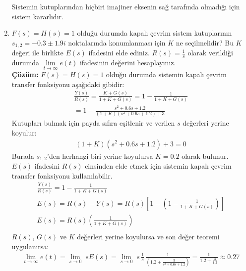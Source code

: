 \documentclass[a4paper,11pt]{article}
\begin{document}
\begin{enumerate}[label=\textbf{\alph*}{.}, leftmargin=\parindent]
    Sistemin kutuplarından hiçbiri imajiner eksenin sağ tarafında olmadığı için sistem kararlıdır.
    \newpage\item $F(s) = H(s) = 1$ olduğu durumda kapalı çevrim sistem kutuplarının $s_{1,2} = -0.3 \pm 1.9i$ noktalarında konumlanması için $K$ ne seçilmelidir? Bu $K$ değeri ile birlikte $E(s)$ ifadesini elde ediniz. $R(s) = \frac{1}{s}$ olarak verildiği durumda $\lim\limits_{t\rightarrow\infty} e(t)$ ifadesinin değerini hesaplayınız.\\[1em]
    \textbf{Çözüm:} $F(s) = H(s) = 1$ olduğu durumda sistemin kapalı çevrim transfer fonksiyonu aşağıdaki gibidir:
    \begin{gather*}
        \frac{Y(s)}{R(s)} = \frac{ K + G(s) }{1 + K + G(s)} = 1 - \frac{ 1 }{1 + K + G(s)}\\[0.8em]
        = 1 - \frac{s^2 + 0.6s + 1.2}{(1+K)(s^2 + 0.6s + 1.2) + 3}
    \end{gather*}
    Kutupları bulmak için payda sıfıra eşitlenir ve verilen $s$ değerleri yerine koyulur:
    \begin{gather*} 
        (1+K)(s^2 + 0.6s + 1.2) + 3 = 0
    \end{gather*}
    Burada $s_{1,2}$'den herhangi biri yerine koyulursa $K = 0.2$ olarak bulunur.\\[1em]
    $E(s)$ ifadesini $R(s)$ cinsinden elde etmek için sistemin kapalı çevrim transfer fonksiyonu kullanılabilir.
    \begin{gather*}
        \frac{Y(s)}{R(s)} = 1 - \frac{ 1 }{1 + K + G(s)}\\[.8em]
        E(s) = R(s) - Y(s) = R(s)\left[1 - \left(1 - \frac{ 1 }{1 + K + G(s)}\right)\right] \\[0.8em]
        E(s) = R(s)\left(\frac{1}{1 + K + G(s)}\right) \\[0.8em]
    \end{gather*}
    $R(s)$, $G(s)$ ve $K$ değerleri yerine koyulursa ve son değer teoremi uygulanırsa:
    \begin{gather*}
        \lim\limits_{t\to\infty}e(t) = \lim\limits_{s\to 0} \;sE(s) = \lim\limits_{s\to 0} \; s \,\frac{1}{s}\,\frac{1}{\left(1.2 + \frac{3}{s^2 + 0.6s + 1.2}\right)} = \frac{1}{1.2 + \frac{3}{1.2}} \approx 0.27
    \end{gather*}
\end{enumerate}
\end{document}
